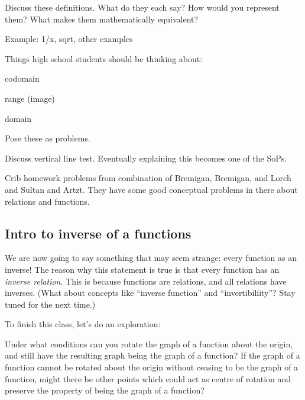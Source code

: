 \documentclass[11pt]{article}
\newenvironment{task}
	{\begin{mdframed}[linecolor=lightgray, linewidth=3pt]\raggedright}
	{\end{mdframed}}
\theoremstyle{definition}
\begin{document}
\begin{task}
Discuss these definitions. What do they each say? How would you represent them? What makes them mathematically equivalent?
\end{task}

Example: 1/x, sqrt, other examples 

Things high school students should be thinking about:
\begin{itemize*}
\item codomain
\item range (image)
\item domain
\end{itemize*}

Pose these as problems. 

Discuss vertical line test. Eventually explaining this becomes one of the SoPs.

Crib homework problems from combination of Bremigan, Bremigan, and Lorch and Sultan and Artzt. They have some good conceptual problems in there about relations and functions.



\subsection{Intro to inverse of a functions}

We are now going to say something that may seem strange: every function as an inverse! The reason why this statement is true is that every function has an {\it inverse relation}. This is because functions are relations, and all relations have inverses. (What about concepts like ``inverse function'' and ``invertibiliity''? Stay tuned for the next time.)

To finish this class, let's do an exploration: 
\begin{task}
Under what conditions can you rotate the graph of a function about the
origin, and still have the resulting graph being the graph of a function? If
the graph of a function cannot be rotated about the origin without ceasing
to be the graph of a function, might there be other points which could act
as centre of rotation and preserve the property of being the graph of a
function?
\end{task}
\end{document}
